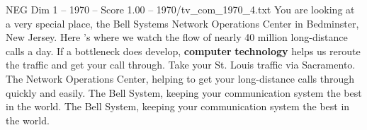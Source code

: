 \begin{textsample}{NEG Dim 1 – 1970 – Score 1.00 – 1970/tv\_com\_1970\_4.txt}  \label{ex:f1_neg_065}
You are looking at a very special place, the Bell Systems Network Operations Center in Bedminster, New Jersey.
Here 's where we watch the flow of nearly 40 million long-distance calls a day.
If a bottleneck does develop, \textbf{computer} \textbf{technology} helps us reroute the traffic and get your call through.
Take your St.
Louis traffic via Sacramento.
The Network Operations Center, helping to get your long-distance calls through quickly and easily.
The Bell System, keeping your communication system the best in the world.
The Bell System, keeping your communication system the best in the world.

\end{textsample}
